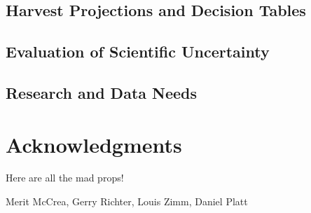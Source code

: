 \documentclass[11pt,
  english,
  a4paper,
]{article}
\begin{document}
\leavevmode\tagmcend\tagstructend


\hypertarget{harvest-projections-and-decision-tables}{%
\subsection{Harvest Projections and Decision Tables}\label{harvest-projections-and-decision-tables}}

\leavevmode\tagmcend\tagstructend


\hypertarget{evaluation-of-scientific-uncertainty}{%
\subsection{Evaluation of Scientific Uncertainty}\label{evaluation-of-scientific-uncertainty}}

\leavevmode\tagmcend\tagstructend


\hypertarget{research-and-data-needs}{%
\subsection{Research and Data Needs}\label{research-and-data-needs}}

\leavevmode\tagmcend\tagstructend


\hypertarget{acknowledgments}{%
\section{Acknowledgments}\label{acknowledgments}}

\leavevmode\tagmcend\tagstructend


Here are all the mad props!

\leavevmode\tagmcend\tagstructend\par


Merit McCrea, Gerry Richter, Louis Zimm, Daniel Platt

\leavevmode\tagmcend\tagstructend\par

\end{document}
